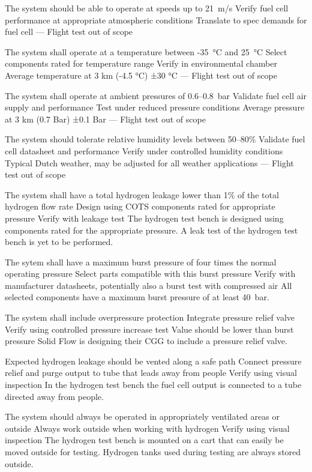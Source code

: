 {The system should be able to operate at speeds up to 21~m/s}
{Verify fuel cell performance at appropriate atmospheric conditions}
{}
{Translate to spec demands for fuel cell}
{--- Flight test out of scope}
{}

{The system shall operate at a temperature between -35~°C and 25~°C}
{Select components rated for temperature range}
{Verify in environmental chamber}
{Average temperature at 3 km (-4.5 °C) ±30 °C}
{--- Flight test out of scope}
{}

{The system shall operate at ambient pressures of 0.6--0.8~bar}
{Validate fuel cell air supply and performance}
{Test under reduced pressure conditions}
{Average pressure at 3 km (0.7 Bar) ±0.1 Bar}
{--- Flight test out of scope}
{}

{The system should tolerate relative humidity levels between 50--80\%}
{Validate fuel cell datasheet and performance}
{Verify under controlled humidity conditions}
{Typical Dutch weather, may be adjusted for all weather applications}
{--- Flight test out of scope}
{}


{The system shall have a total hydrogen leakage lower than 1\% of the total hydrogen flow rate}
{Design using COTS components rated for appropriate pressure}
{Verify with leakage test}
{}
{The hydrogen test bench is designed using components rated for the appropriate pressure. A leak test of the hydrogen test bench is yet to be performed.}
{}

{The sytem shall have a maximum burst pressure of four times the normal operating pressure}
{Select parts compatible with this burst pressure}
{Verify with manufacturer datasheets, potentially also a burst test with compressed air}
{}
{All selected components have a maximum burst pressure of at least 40~bar.}
{}

{The system shall include overpressure protection}
{Integrate pressure relief valve}
{Verify using controlled pressure increase test}
{Value should be lower than burst pressure}
{Solid Flow is designing their CGG to include a pressure relief valve.}
{}

{Expected hydrogen leakage should be vented along a safe path}
{Connect pressure relief and purge output to tube that leads away from people}
{Verify using visual inspection}
{}
{In the hydrogen test bench the fuel cell output is connected to a tube directed away from people.}
{}

{The system should always be operated in appropriately ventilated areas or outside}
{Always work outside when working with hydrogen}
{Verify using visual inspection}
{}
{The hydrogen test bench is mounted on a cart that can easily be moved outside for testing. Hydrogen tanks used during testing are always stored outside.}
{}
